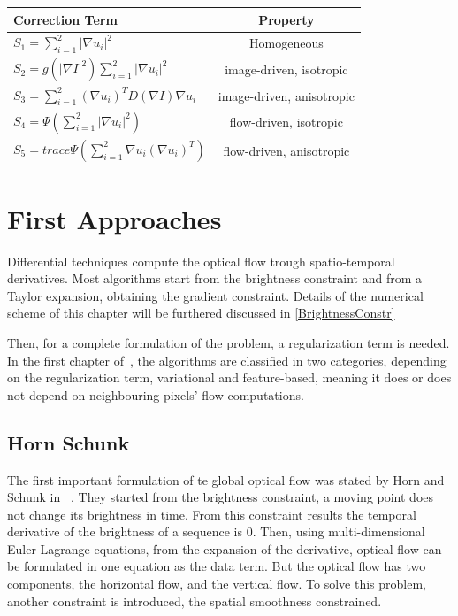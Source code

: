 \documentclass[12pt,a4paper,twoside]{report}
\begin{document}
{\renewcommand{\arraystretch}{2}
	\begin{center}
		
		\begin{tabular}{| l | c |}
			\hline
			Correction Term & Property  \\ \hline
			$S_1 = \sum_{i=1}^{2}{|\nabla u_i|^2}$ & Homogeneous \\ \hline
			
			$S_2 = g \left( |\nabla I|^2 \right) \sum_{i=1}^{2} {|\nabla u_i|^2}$ & image-driven, isotropic  \\ \hline
			
			$S_3 = \sum_{i=1}^{2} \left( \nabla u_i \right)^T D \left( \nabla I \right) \nabla u_i$ & image-driven, anisotropic  \\
			\hline
			
			$S_4 = \Psi \left( \sum_{i=1}^{2} |\nabla u_i|^2 \right)$ & flow-driven, isotropic  \\
			\hline
			
			$S_5 = trace \Psi \left( \sum_{i=1}^{2} \nabla u_i \left( \nabla u_i \right)^T \right)$  & flow-driven, anisotropic \\
			\hline
		\end{tabular}
	\end{center}

\section{First Approaches}

Differential techniques compute the optical flow trough spatio-temporal derivatives.
Most algorithms start from the brightness constraint and from a Taylor expansion, obtaining the gradient constraint. Details of the numerical scheme of this chapter will be furthered discussed in \ref{BrightnessConstr}

Then, for a complete formulation of the problem, a regularization term is needed. In the first chapter of~\cite{wedel2011stereo}, the algorithms are classified in two categories, depending on the regularization term, variational and feature-based, meaning it does or does not depend on neighbouring pixels' flow computations.
\subsection{Horn Schunk}
The first important formulation of te global optical flow was stated by Horn and Schunk in ~\cite{HSOpticalFlow}. They started from the brightness constraint, a moving point does not change its brightness in time. From this constraint results the temporal derivative of the brightness of a sequence is $0$. Then,  using multi-dimensional Euler-Lagrange equations, from the expansion of the derivative, optical flow  can be formulated in one equation as the data term. But the optical flow has two components, the horizontal flow, and the vertical flow. To solve this problem, another constraint is introduced, the spatial smoothness constrained. 

}
\end{document}
